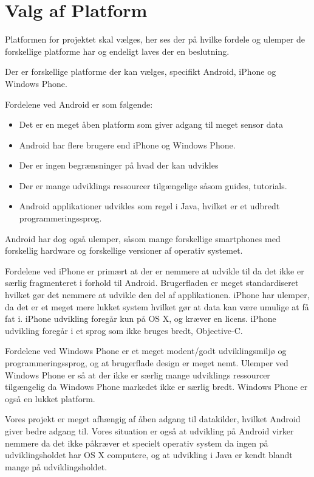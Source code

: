 \section{Valg af Platform}\label{sec:valg_af_android}
Platformen for projektet skal vælges, her ses der på hvilke fordele og ulemper de forskellige platforme har og endeligt laves der en beslutning.

Der er forskellige platforme der kan vælges, specifikt Android, iPhone og Windows Phone.

Fordelene ved Android er som følgende:
\begin{itemize}
\item Det er en meget åben platform som giver adgang til meget sensor data
\item Android har flere brugere end iPhone og Windows Phone.
\item Der er ingen begrænsninger på hvad der kan udvikles
\item Der er mange udviklings ressourcer tilgængelige såsom guides, tutorials.
\item Android applikationer udvikles som regel i Java, hvilket er et udbredt programmeringssprog.
\end{itemize}

Android har dog også ulemper, såsom mange forskellige smartphones med forskellig hardware og forskellige versioner af operativ systemet.

Fordelene ved iPhone er primært at der er nemmere at udvikle til da det ikke er særlig fragmenteret i forhold til Android. 
Brugerfladen er meget standardiseret hvilket gør det nemmere at udvikle den del af applikationen. 
iPhone har ulemper, da det er et meget mere lukket system hvilket gør at data kan være umulige at få fat i. iPhone udvikling foregår kun på OS X, og kræver en licens. iPhone udvikling foregår i et sprog som ikke bruges bredt, Objective-C.

Fordelene ved Windows Phone er et meget modent/godt udviklingsmiljø og programmeringssprog, og at brugerflade design er meget nemt. 
Ulemper ved Windows Phone er så at der ikke er særlig mange udviklings ressourcer tilgængelig da Windows Phone markedet ikke er særlig bredt. Windows Phone er også en lukket platform.

Vores projekt er meget afhængig af åben adgang til datakilder, hvilket Android giver bedre adgang til. Vores situation er også at udvikling på Android virker nemmere da det ikke påkræver et specielt operativ system da ingen på udviklingsholdet har OS X computere, og at udvikling i Java er kendt blandt mange på udviklingsholdet.